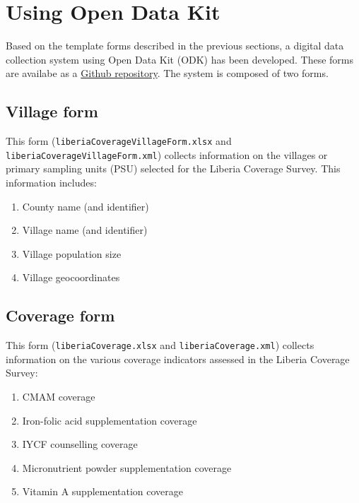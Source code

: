\documentclass[12pt,a4paper]{book}
\theoremstyle{definition}
\theoremstyle{definition}
\theoremstyle{definition}
\theoremstyle{remark}
\begin{document}
\hypertarget{using-open-data-kit}{%
\section{Using Open Data Kit}\label{using-open-data-kit}}

Based on the template forms described in the previous sections, a
digital data collection system using Open Data Kit (ODK) has been
developed. These forms are availabe as a
\href{https://github.com/validmeasures/liberiaS3Mforms}{Github
repository}. The system is composed of two forms.

\hypertarget{village-form}{%
\subsection{Village form}\label{village-form}}

This form (\texttt{liberiaCoverageVillageForm.xlsx} and
\texttt{liberiaCoverageVillageForm.xml}) collects information on the
villages or primary sampling units (PSU) selected for the Liberia
Coverage Survey. This information includes:

\begin{enumerate}
\def\labelenumi{\arabic{enumi}.}
\item
  County name (and identifier)
\item
  Village name (and identifier)
\item
  Village population size
\item
  Village geocoordinates
\end{enumerate}

\hypertarget{coverage-form}{%
\subsection{Coverage form}\label{coverage-form}}

This form (\texttt{liberiaCoverage.xlsx} and
\texttt{liberiaCoverage.xml}) collects information on the various
coverage indicators assessed in the Liberia Coverage Survey:

\begin{enumerate}
\def\labelenumi{\arabic{enumi}.}
\item
  CMAM coverage
\item
  Iron-folic acid supplementation coverage
\item
  IYCF counselling coverage
\item
  Micronutrient powder supplementation coverage
\item
  Vitamin A supplementation coverage
\end{enumerate}
\end{document}
